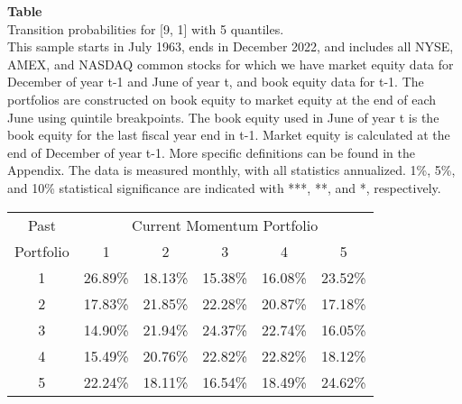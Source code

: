\begin{table*}[ht!]
\raggedright
{}
\label{tab: transition_probs_[9, 1]_with_5_quantiles}
\textbf{Table \thetable} \\
Transition probabilities for [9, 1] with 5 quantiles. \\
\hspace*{1em}This sample starts in July 1963, ends in December 2022, and includes all NYSE, AMEX, and NASDAQ common stocks for which we have market equity data for December of year t-1 and June of year t, and book equity data for t-1. The portfolios are constructed on book equity to market equity at the end of each June using quintile breakpoints.  The book equity used in June of year t is the book equity for the last fiscal year end in t-1.  Market equity is calculated at the end of December of year t-1.  More specific definitions can be found in the Appendix.  The data is measured monthly, with all statistics annualized.  1\%, 5\%, and 10\% statistical significance are indicated with ***, **, and *, respectively. \\
\vspace{0.5em}
\centering
\begin{adjustbox}{max width=\textwidth}
\begin{tabular}{@{}cccccc@{}}
\toprule
Past & \multicolumn{5}{c}{Current Momentum Portfolio} \\
Portfolio & 1 & 2 & 3 & 4 & 5 \\
\midrule
1 & 26.89\% & 18.13\% & 15.38\% & 16.08\% & 23.52\% \\
2 & 17.83\% & 21.85\% & 22.28\% & 20.87\% & 17.18\% \\
3 & 14.90\% & 21.94\% & 24.37\% & 22.74\% & 16.05\% \\
4 & 15.49\% & 20.76\% & 22.82\% & 22.82\% & 18.12\% \\
5 & 22.24\% & 18.11\% & 16.54\% & 18.49\% & 24.62\% \\
\bottomrule
\end{tabular}
\end{adjustbox}
\end{table*}